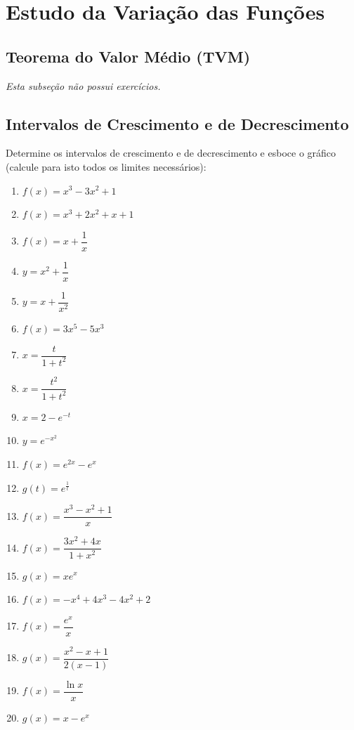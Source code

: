 \setcounter{section}{8}
\setcounter{subsection}{0}

\section{Estudo da Variação das Funções}

\subsection{Teorema do Valor Médio (TVM)}
\textit{Esta subseção não possui exercícios.}

\clearpage

\subsection{Intervalos de Crescimento e de Decrescimento}

\begin{exercicio}[1]
Determine os intervalos de crescimento e de decrescimento e esboce o gráfico (calcule para isto todos os limites necessários):
\begin{enumerate}[label=\alph*)]
    \item $f(x) = x^3 - 3x^2 + 1$
    \item $f(x) = x^3 + 2x^2 + x + 1$
    \item $f(x) = x + \dfrac{1}{x}$
    \item $y = x^2 + \dfrac{1}{x}$
    \item $y = x + \dfrac{1}{x^2}$
    \item $f(x) = 3x^5 - 5x^3$
    \item $x = \dfrac{t}{1 + t^2}$
    \item $x = \dfrac{t^2}{1 + t^2}$
    \item $x = 2 - e^{-t}$
    \item $y = e^{-x^2}$
    \item $f(x) = e^{2x} - e^x$
    \item $g(t) = e^{\frac{1}{t}}$
    \item $f(x) = \dfrac{x^3 - x^2 + 1}{x}$
    \item $f(x) = \dfrac{3x^2 + 4x}{1 + x^2}$
    \item $g(x) = x e^x$
    \item $f(x) = -x^4 + 4x^3 - 4x^2 + 2$
    \item $f(x) = \dfrac{e^x}{x}$
    \item $g(x) = \dfrac{x^2 - x + 1}{2(x - 1)}$
    \item $f(x) = \dfrac{\ln x}{x}$
    \item $g(x) = x - e^x$
\end{enumerate}
\end{exercicio}

